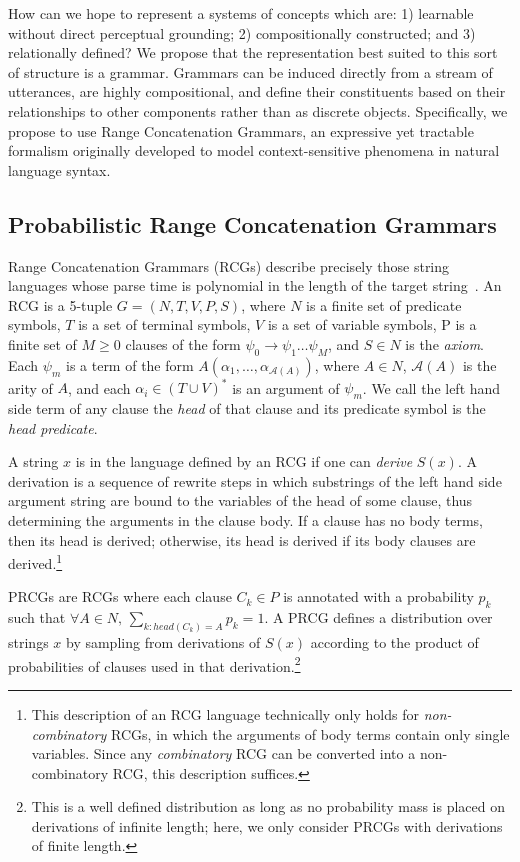 \documentclass[10pt,letterpaper]{article}
\begin{document}
How can we hope to represent a systems of concepts which are: 1)
learnable without direct perceptual grounding; 2) compositionally
constructed; and 3) relationally defined? We propose that the
representation best suited to this sort of structure is a
grammar. Grammars can be induced directly from a stream of utterances,
are highly compositional, and define their constituents based on their
relationships to other components rather than as discrete
objects. Specifically, we propose to use Range Concatenation Grammars,
an expressive yet tractable formalism originally developed to model
context-sensitive phenomena in natural language syntax.

\subsection{Probabilistic Range Concatenation Grammars}

Range Concatenation Grammars (RCGs) describe precisely those string
languages whose parse time is polynomial in the length of the target
string~\citep{boullier2005range}. An RCG is a 5-tuple $G=(N, T, V, P,
S)$, where $N$ is a finite set of predicate symbols, $T$ is a set of
terminal symbols, $V$ is a set of variable symbols, P is a finite set
of $M \geq 0$ clauses of the form $\psi_0 \rightarrow \psi_1 \dots
\psi_M$, and $S \in N$ is the \emph{axiom}. Each $\psi_m$ is a term of
the form $A(\alpha_1, \dots, \alpha_{\mathcal{A}(A)})$, where $A \in
N$, $\mathcal{A}(A)$ is the arity of $A$, and each $\alpha_i \in (T
\cup V)^*$ is an argument of $\psi_m$. We call the left hand side term
of any clause the \emph{head} of that clause and its predicate symbol
is the \emph{head predicate}.

A string $x$ is in the language defined by an RCG if one can
\emph{derive} $S(x)$. A derivation is a sequence of rewrite steps in
which substrings of the left hand side argument string are bound to
the variables of the head of some clause, thus determining the
arguments in the clause body. If a clause has no body terms, then its
head is derived; otherwise, its head is derived if its body clauses
are derived.\footnote{This description of an RCG language technically
  only holds for \emph{non-combinatory} RCGs, in which the arguments
  of body terms contain only single variables. Since any
  \emph{combinatory} RCG can be converted into a non-combinatory RCG,
  this description suffices.}

PRCGs are RCGs where each clause $C_k \in P$ is annotated with
a probability $p_k$ such that ${\forall A \in N, \,
  \sum_{k:head(C_k)=A} p_k = 1}$. A PRCG defines a distribution over
strings $x$ by sampling from derivations of $S(x)$ according to the
product of probabilities of clauses used in that derivation.\footnote{This is a
well defined distribution as long as no probability mass is placed on
derivations of infinite length; here, we only consider PRCGs with
derivations of finite length.}
\end{document}
